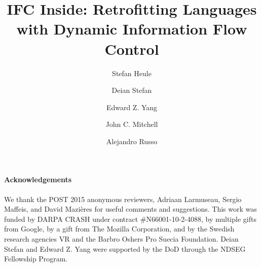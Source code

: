 \documentclass{llncs}
\newif\ifextended
\newif\ifextendedtitle
\begin{document}


\title{
IFC Inside: Retrofitting Languages with Dynamic Information Flow Control
}
\ifextendedtitle
\subtitle{Extended Version}
\fi

\author{
 Stefan Heule \and
 Deian Stefan \and
 Edward Z. Yang \and
 John C. Mitchell \and
 Alejandro Russo
}

\maketitle


{\small
\paragraph{Acknowledgements}
We thank the POST 2015 anonymous reviewers, 
Adriaan Larmuseau,
Sergio Maffeis, and
David Mazi\`eres
for useful comments and suggestions.
%
This work was funded by DARPA CRASH under contract \#N66001-10-2-4088,
by multiple gifts from Google, by a gift from The Mozilla Corporation,
and by the Swedish research agencies VR and the Barbro Oshers Pro
Suecia Foundation.
%
Deian Stefan and Edward Z. Yang were supported by the DoD through the
NDSEG Fellowship Program.
}


{\frenchspacing\scriptsize
  \setlength{\bibsep}{2pt}
  
  
}

\ifextended
\clearpage
\balance
\fi
\end{document}

